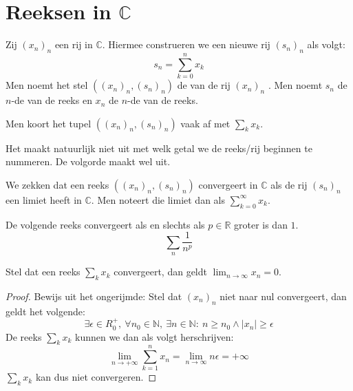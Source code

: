 \documentclass[main.tex]{subfiles}
\begin{document}
\section{Reeksen in $\mathbb{C}$}
\label{sec:reeksen-mathbbc}

\begin{de}
  Zij $(x_{n})_{n}$ een rij in $\mathbb{C}$.
  Hiermee construeren we een nieuwe rij $(s_{n})_{n}$ als volgt:
  \[  s_{n} = \sum_{k=0}^{n}x_{k}  \]
  Men noemt het stel $((x_{n})_{n}, (s_{n})_{n})$ de  van de rij $(x_{n})_{n}$ .
  Men noemt $s_{n}$ de $n$-de  van de reeks en $x_{n}$ de $n$-de  van de reeks.
\end{de}

\begin{de}
  Men koort het tupel $((x_{n})_{n}, (s_{n})_{n})$ vaak af met $\sum_{k}x_{k}$.
\end{de}

\begin{opm}
  Het maakt natuurlijk niet uit met welk getal we de reeks/rij beginnen te nummeren.
  De volgorde maakt wel uit. \needed
\end{opm}

\begin{de}
  We zekken dat een reeks $((x_{n})_{n}, (s_{n})_{n})$ convergeert in $\mathbb{C}$ als de rij $(s_{n})_{n}$ een limiet heeft in $\mathbb{C}$.
  Men noteert die limiet dan als $\sum_{k=0}^{\infty}x_{k}$.
\end{de}

\begin{vb}
  De volgende reeks convergeert als en slechts als $p \in \mathbb{R}$ groter is dan $1$.
  \[ \sum_{n}\frac{1}{n^{p}} \]
\end{vb}

\begin{bpr}
  \label{pr:termen-van-convergente-reeks-naar-0}
  Stel dat een reeks $\sum_{k}x_{k}$ convergeert, dan geldt $\lim_{n \rightarrow \infty}x_{n} = 0$.

  \begin{proof}
    Bewijs uit het ongerijmde:
    Stel dat $(x_{n})_{n}$ niet naar nul convergeert, dan geldt het volgende:
    \[ \exists \epsilon \in R_{0}^{+},\ \forall n_{0}\in \mathbb{N},\ \exists n\in \mathbb{N}:\ n \ge n_{0} \wedge |x_{n}| \ge \epsilon \]
    De reeks $\sum_{k}x_{k}$ kunnen we dan als volgt herschrijven:
    \[ \lim_{n\rightarrow +\infty}\sum_{k=1}^{n}x_{n} = \lim_{n \rightarrow \infty}n\epsilon = +\infty \]
    $\sum_{k}x_{k}$ kan dus niet convergeren.
    \feed
  \end{proof}
\end{bpr}
\end{document}
